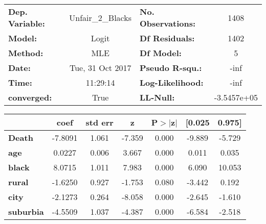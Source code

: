 \documentclass{report}
\begin{document}
\begin{center}
\begin{tabular}{lclc}
\toprule
\textbf{Dep. Variable:} & Unfair_2_Blacks  & \textbf{  No. Observations:  } &      1408    \\
\textbf{Model:}         &      Logit       & \textbf{  Df Residuals:      } &      1402    \\
\textbf{Method:}        &       MLE        & \textbf{  Df Model:          } &         5    \\
\textbf{Date:}          & Tue, 31 Oct 2017 & \textbf{  Pseudo R-squ.:     } &      -inf    \\
\textbf{Time:}          &     11:29:14     & \textbf{  Log-Likelihood:    } &       -inf   \\
\textbf{converged:}     &       True       & \textbf{  LL-Null:           } & -3.5457e+05  \\
\bottomrule
\end{tabular}
\begin{tabular}{lcccccc}
                  & \textbf{coef} & \textbf{std err} & \textbf{z} & \textbf{P$>$$|$z$|$} & \textbf{[0.025} & \textbf{0.975]}  \\
\midrule
\textbf{Death}    &      -7.8091  &        1.061     &    -7.359  &         0.000        &       -9.889    &       -5.729     \\
\textbf{age}      &       0.0227  &        0.006     &     3.667  &         0.000        &        0.011    &        0.035     \\
\textbf{black}    &       8.0715  &        1.011     &     7.983  &         0.000        &        6.090    &       10.053     \\
\textbf{rural}    &      -1.6250  &        0.927     &    -1.753  &         0.080        &       -3.442    &        0.192     \\
\textbf{city}     &      -2.1273  &        0.264     &    -8.058  &         0.000        &       -2.645    &       -1.610     \\
\textbf{suburbia} &      -4.5509  &        1.037     &    -4.387  &         0.000        &       -6.584    &       -2.518     \\
\bottomrule
\end{tabular}
\end{center}
\end{document}
